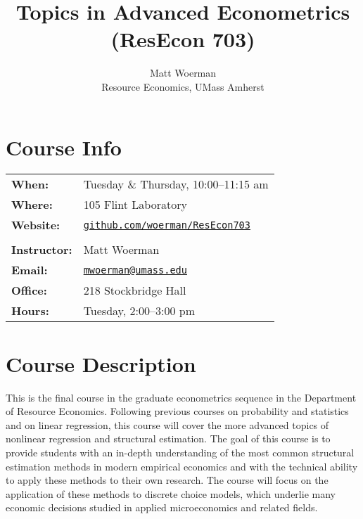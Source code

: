 \documentclass[11pt,letterpaper]{article}
\newcommand{\subtitle}[1]{%
	\posttitle{%
		\par\end{center}
	\begin{center}\large#1\end{center}
	\vskip0.5em}%
}
\begin{document}
\title{Topics in Advanced Econometrics (ResEcon 703)}
\subtitle{Fall 2019 Syllabus\vspace{-2ex}}
\author{Matt Woerman\\Resource Economics, UMass Amherst}
\date{\vspace{-5ex}}

\maketitle

\section*{Course Info}

\begin{tabular}{ll} 
	\textbf{When:} & Tuesday \& Thursday, 10:00--11:15 am \\
	\textbf{Where:} & 105 Flint Laboratory \\
	\textbf{Website:} & \href{https://github.com/woerman/ResEcon703}{\texttt{github.com/woerman/ResEcon703}} \\
	\\
	\textbf{Instructor:} & Matt Woerman \\
	\textbf{Email:} & \href{mailto:mwoerman@umass.edu}{\texttt{mwoerman@umass.edu}} \\
	\textbf{Office:} & 218 Stockbridge Hall \\
	\textbf{Hours:} & Tuesday, 2:00--3:00 pm
\end{tabular} 

\section*{Course Description}

This is the final course in the graduate econometrics sequence in the Department of Resource Economics. Following previous courses on probability and statistics and on linear regression, this course will cover the more advanced topics of nonlinear regression and structural estimation. The goal of this course is to provide students with an in-depth understanding of the most common structural estimation methods in modern empirical economics and with the technical ability to apply these methods to their own research. The course will focus on the application of these methods to discrete choice models, which underlie many economic decisions studied in applied microeconomics and related fields.
\end{document}
